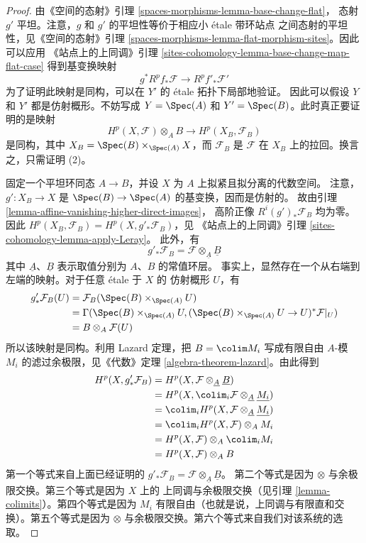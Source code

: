 \begin{proof}
由《空间的态射》引理 \ref{spaces-morphisms-lemma-base-change-flat}，
态射 $g'$ 平坦。注意，$g$ 和 $g'$ 的平坦性等价于相应小 \'etale 带环站点
之间态射的平坦性，见《空间的态射》引理
\ref{spaces-morphisms-lemma-flat-morphism-sites}。因此可以应用
《站点上的上同调》引理
\ref{sites-cohomology-lemma-base-change-map-flat-case}
得到基变换映射
$$
g^*R^pf_*\mathcal{F} \longrightarrow R^pf'_*\mathcal{F}'
$$
为了证明此映射是同构，可以在 $Y'$ 的 \'etale 拓扑下局部地验证。
因此可以假设 $Y$ 和 $Y'$ 都是仿射概形。不妨写成
$Y = \Spec(A)$ 和 $Y' = \Spec(B)$。此时真正要证明的是映射
$$
H^p(X, \mathcal{F}) \otimes_A B \longrightarrow H^p(X_B, \mathcal{F}_B)
$$
是同构，其中 $X_B = \Spec(B) \times_{\Spec(A)} X$，而
$\mathcal{F}_B$ 是 $\mathcal{F}$ 在 $X_B$ 上的拉回。换言之，只需证明 (2)。

\medskip\noindent
固定一个平坦环同态 $A \to B$，并设 $X$ 为 $A$ 上拟紧且拟分离的代数空间。
注意，$g' : X_B \to X$ 是 $\Spec(B) \to \Spec(A)$ 的基变换，因而是仿射的。
故由引理 \ref{lemma-affine-vanishing-higher-direct-images}，
高阶正像 $R^i(g')_*\mathcal{F}_B$ 均为零。因此
$H^p(X_B, \mathcal{F}_B) = H^p(X, g'_*\mathcal{F}_B)$，见
《站点上的上同调》引理 \ref{sites-cohomology-lemma-apply-Leray}。
此外，有
$$
g'_*\mathcal{F}_B = \mathcal{F} \otimes_{\underline{A}} \underline{B}
$$
其中 $\underline{A}$、$\underline{B}$ 表示取值分别为 $A$、$B$ 的常值环层。
事实上，显然存在一个从右端到左端的映射。对于任意 \'etale 于 $X$ 的
仿射概形 $U$，有
\begin{align*}
g'_*\mathcal{F}_B(U) & = \mathcal{F}_B(\Spec(B) \times_{\Spec(A)} U) \\
& =
\Gamma(\Spec(B) \times_{\Spec(A)} U,
(\Spec(B) \times_{\Spec(A)} U \to U)^*\mathcal{F}|_U) \\
& =
B \otimes_A \mathcal{F}(U)
\end{align*}
所以该映射是同构。利用 Lazard 定理，把 $B = \colim M_i$ 写成有限自由
$A$-模 $M_i$ 的滤过余极限，见《代数》定理
\ref{algebra-theorem-lazard}。由此得到
\begin{align*}
H^p(X, g'_*\mathcal{F}_B) &
= H^p(X, \mathcal{F} \otimes_{\underline{A}} \underline{B}) \\
& = H^p(X, \colim_i \mathcal{F} \otimes_{\underline{A}} \underline{M_i}) \\
& = \colim_i H^p(X, \mathcal{F} \otimes_{\underline{A}} \underline{M_i}) \\
& = \colim_i H^p(X, \mathcal{F}) \otimes_A M_i \\
& = H^p(X, \mathcal{F}) \otimes_A \colim_i M_i \\
& = H^p(X, \mathcal{F}) \otimes_A B
\end{align*}
第一个等式来自上面已经证明的
$g'_*\mathcal{F}_B = \mathcal{F} \otimes_{\underline{A}} \underline{B}$。
第二个等式是因为 $\otimes$ 与余极限交换。第三个等式是因为 $X$ 上的
上同调与余极限交换（见引理 \ref{lemma-colimits}）。第四个等式是因为
$M_i$ 有限自由（也就是说，上同调与有限直和交换）。第五个等式是因为
$\otimes$ 与余极限交换。第六个等式来自我们对该系统的选取。
\end{proof}

